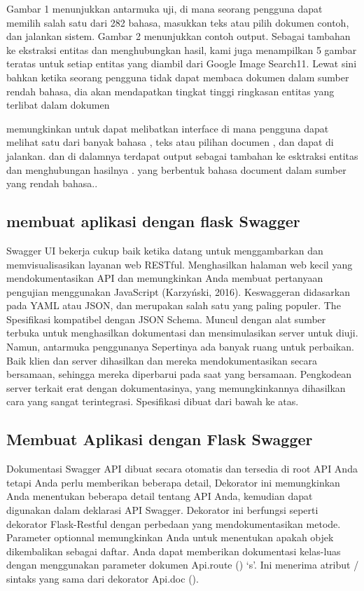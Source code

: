 \documentclass[12pt]{article}
\begin{document}
Gambar 1 menunjukkan antarmuka uji, di mana seorang pengguna dapat memilih salah satu dari 282 bahasa, masukkan teks atau pilih dokumen contoh, dan jalankan sistem. Gambar 2 menunjukkan contoh output. Sebagai tambahan ke ekstraksi entitas dan menghubungkan hasil, kami juga menampilkan 5 gambar teratas untuk setiap entitas yang diambil dari Google Image Search11. Lewat sini bahkan ketika seorang pengguna tidak dapat membaca dokumen dalam sumber rendah bahasa, dia akan mendapatkan tingkat tinggi ringkasan entitas yang terlibat dalam dokumen

memungkinkan untuk dapat melibatkan interface di mana pengguna dapat melihat satu dari banyak bahasa , teks atau pilihan documen , dan dapat di jalankan. dan di dalamnya terdapat output sebagai tambahan ke esktraksi entitas dan menghubungan hasilnya . yang berbentuk bahasa document dalam sumber yang rendah bahasa.\cite{zhangelisa}.

\subsection{membuat aplikasi dengan flask Swagger }
Swagger UI bekerja cukup baik ketika datang untuk menggambarkan dan memvisualisasikan layanan web RESTful. Menghasilkan halaman web kecil yang mendokumentasikan API dan memungkinkan Anda membuat pertanyaan pengujian menggunakan JavaScript (Karzyński, 2016). Keswaggeran didasarkan pada YAML atau JSON, dan merupakan salah satu yang paling populer. The Spesifikasi kompatibel dengan JSON Schema. Muncul dengan alat sumber terbuka untuk menghasilkan dokumentasi dan mensimulasikan server untuk diuji. Namun, antarmuka penggunanya Sepertinya ada banyak ruang untuk perbaikan. Baik klien dan server dihasilkan dan mereka mendokumentasikan secara bersamaan, sehingga mereka diperbarui pada saat yang bersamaan. Pengkodean server terkait erat dengan dokumentasinya, yang memungkinkannya dihasilkan cara yang sangat terintegrasi. Spesifikasi dibuat dari bawah ke atas\cite{ortegacatalogo}.

\subsection{Membuat Aplikasi dengan Flask Swagger}
Dokumentasi Swagger API dibuat secara otomatis dan tersedia di root API Anda tetapi Anda perlu memberikan beberapa detail, Dekorator ini memungkinkan Anda menentukan beberapa detail tentang API Anda, kemudian dapat digunakan dalam deklarasi API Swagger. Dekorator ini berfungsi seperti dekorator Flask-Restful dengan perbedaan yang mendokumentasikan metode. Parameter optionnal memungkinkan Anda untuk menentukan apakah objek dikembalikan sebagai daftar. Anda dapat memberikan dokumentasi kelas-luas dengan menggunakan parameter dokumen Api.route () ‘s’. Ini menerima atribut / sintaks yang sama dari dekorator Api.doc ()\cite{de2017api}.
\end{document}
